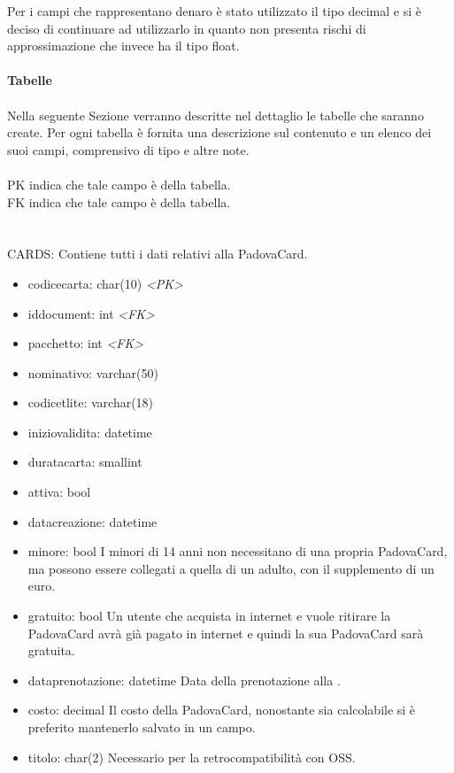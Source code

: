 Per i campi che rappresentano denaro è stato utilizzato il tipo decimal e si è deciso di continuare ad utilizzarlo in quanto non presenta rischi di approssimazione che invece ha il tipo float. \\ \\
\textbf{Tabelle}\\ \\
Nella seguente Sezione verranno descritte nel dettaglio le tabelle che saranno create. Per ogni tabella è fornita una descrizione sul contenuto e un elenco dei suoi campi, comprensivo di tipo e altre note. \\ \\
PK indica che tale campo è  della tabella. \\
FK indica che tale campo  è  della tabella.\\
\\ \\
CARDS: Contiene tutti i dati relativi alla PadovaCard.
\begin{itemize}
\item codicecarta: char(10) \textit{\textless PK\textgreater}
\item iddocument: int \textit{\textless FK\textgreater}
\item pacchetto: int \textit{\textless FK\textgreater}
\item nominativo: varchar(50)
\item codicetlite: varchar(18)
\item iniziovalidita: datetime
\item duratacarta: smallint
\item attiva: bool
\item datacreazione: datetime
\item minore: bool I minori di 14 anni non necessitano di una propria PadovaCard, ma possono essere collegati a quella di un adulto, con il supplemento di un euro.
\item gratuito: bool Un utente che acquista in internet e vuole ritirare la PadovaCard avrà già pagato in internet e quindi la sua PadovaCard sarà gratuita.
\item dataprenotazione: datetime Data della prenotazione alla \cappella.
\item costo: decimal Il costo della PadovaCard, nonostante sia calcolabile si è preferito mantenerlo salvato in un campo.
\item titolo: char(2) Necessario per la retrocompatibilità con OSS.
\end{itemize}
